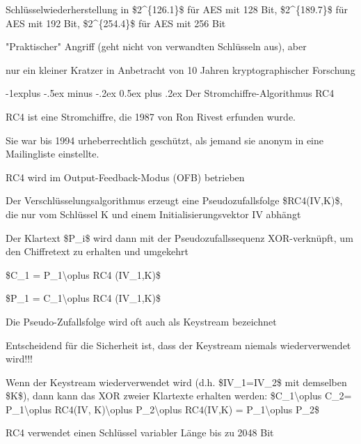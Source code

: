 \documentclass[a4paper]{article}
\makeatletter
\renewcommand{\subsection}{\@startsection{subsection}{2}{0mm}%
 {-1explus -.5ex minus -.2ex}%
 {0.5ex plus .2ex}%
 {\normalfont\normalsize\bfseries}}
\makeatother
\begin{document}
\begin{multicols}{3}
\begin{itemize*}
            \begin{itemize*}
                  \item Schlüsselwiederherstellung in \$2\^{}\{126.1\}\$ für AES mit 128 Bit, \$2\^{}\{189.7\}\$ für AES mit 192 Bit, \$2\^{}\{254.4\}\$ für AES mit 256 Bit
                  \item "Praktischer" Angriff (geht nicht von verwandten Schlüsseln aus), aber
                  \item nur ein kleiner Kratzer in Anbetracht von 10 Jahren kryptographischer Forschung
            \end{itemize*}
      \end{itemize*}


      \subsection{Der Stromchiffre-Algorithmus
            RC4}

      \begin{itemize*}
            \item
            RC4 ist eine Stromchiffre, die 1987 von Ron Rivest erfunden wurde.
            \item
            Sie war bis 1994 urheberrechtlich geschützt, als jemand sie anonym in
            eine Mailingliste einstellte.
            \item
            RC4 wird im Output-Feedback-Modus (OFB) betrieben

            \begin{itemize*}
                  \item Der Verschlüsselungsalgorithmus erzeugt eine Pseudozufallsfolge \$RC4(IV,K)\$, die nur vom Schlüssel K und einem Initialisierungsvektor IV abhängt
                  \item Der Klartext \$P\_i\$ wird dann mit der Pseudozufallssequenz XOR-verknüpft, um den Chiffretext zu erhalten und umgekehrt
                  \begin{itemize*} \item \$C\_1 = P\_1\textbackslash oplus RC4 (IV\_1,K)\$ \item \$P\_1 = C\_1\textbackslash oplus RC4 (IV\_1,K)\$ \end{itemize*}
                  \item Die Pseudo-Zufallsfolge wird oft auch als Keystream bezeichnet
                  \item Entscheidend für die Sicherheit ist, dass der Keystream niemals wiederverwendet wird!!!
                  \begin{itemize*} \item Wenn der Keystream wiederverwendet wird (d.h. \$IV\_1=IV\_2\$ mit demselben \$K\$), dann kann das XOR zweier Klartexte erhalten werden: \$C\_1\textbackslash oplus C\_2= P\_1\textbackslash oplus RC4(IV, K)\textbackslash oplus P\_2\textbackslash oplus RC4(IV,K) = P\_1\textbackslash oplus P\_2\$ \end{itemize*}
            \end{itemize*}
            \item
            RC4 verwendet einen Schlüssel variabler Länge bis zu 2048 Bit


\end{itemize*}
\end{multicols}
\end{document}
